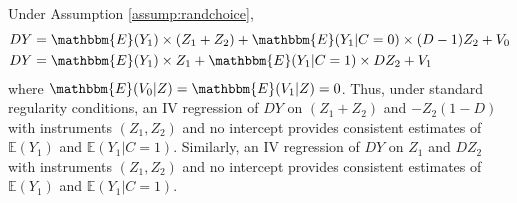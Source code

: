\begin{prop}
\label{prop:ASLreg}
Under Assumption \ref{assump:randchoice},
\begin{align}
\label{eq:ASL0}
    D Y &= \mathbbm{E}(Y_{1}) \times(Z_1 + Z_2) + \mathbbm{E}(Y_{1}|C=0)\times (D - 1)Z_2 + V_{0}\\
\label{eq:ASL1}
    D Y &= \mathbbm{E}(Y_{1}) \times Z_1 + \mathbbm{E}(Y_{1}|C=1)\times D Z_2+ V_{1}
\end{align}
where $\mathbbm{E}(V_0|Z) = \mathbbm{E}(V_1|Z) = 0$.
Thus, under standard regularity conditions, an IV regression of $DY$ on $(Z_1 + Z_2)$ and $-Z_2(1 - D)$ with instruments $(Z_1, Z_2)$ and no intercept provides consistent estimates of $\mathbb{E}(Y_1)$ and $\mathbb{E}(Y_1|C=1)$.
Similarly, an IV regression of $DY$ on $Z_1$ and $DZ_2$ with instruments $(Z_1, Z_2)$ and no intercept provides consistent estimates of $\mathbb{E}(Y_1)$ and $\mathbb{E}(Y_1|C=1)$. 
\end{prop}


